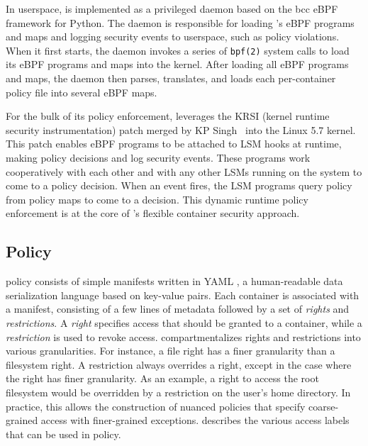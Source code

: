 In userspace, \bpfcontain{} is implemented as a privileged daemon based on the bcc \cite{bcc} eBPF framework for Python. The daemon is responsible for loading \bpfcontain{}'s eBPF programs and maps and logging security events to userspace, such as policy violations.  When it first starts, the daemon invokes a series of \texttt{bpf(2)} system calls to load its eBPF programs and maps into the kernel. After loading all eBPF programs and maps, the daemon then parses, translates, and loads each per-container policy file into several eBPF maps.

For the bulk of its policy enforcement, \bpfcontain{} leverages the KRSI (kernel runtime security instrumentation) patch merged by KP Singh~\cite{singh2019_krsi,corbet2019_krsi} into the Linux 5.7 kernel. This patch enables eBPF programs to be attached to LSM hooks at runtime, making policy decisions and log security events.  These programs work cooperatively with each other and with any other LSMs running on the system to come to a policy decision. When an event fires, the LSM programs query policy from policy maps to come to a decision. This dynamic runtime policy enforcement is at the core of \bpfcontain{}'s flexible container security approach.

\subsection{\bpfcontain{} Policy}
\label{sub:policy}

\bpfcontain{} policy consists of simple manifests written in YAML \cite{yaml}, a human-readable data serialization language based on key-value pairs.  Each \bpfcontain{} container is associated with a manifest, consisting of a few lines of metadata followed by a set of \textit{rights} and \textit{restrictions}.  A \textit{right} specifies access that should be granted to a container, while a \textit{restriction} is used to revoke access. \bpfcontain{} compartmentalizes rights and restrictions into various granularities. For instance, a file right has a finer granularity than a filesystem right. A restriction always overrides a right, except in the case where the right has finer granularity. As an example, a right to access the root filesystem would be overridden by a restriction on the user's home directory. In practice, this allows the construction of nuanced policies that specify coarse-grained access with finer-grained exceptions.   describes the various access labels that can be used in \bpfcontain{} policy.

